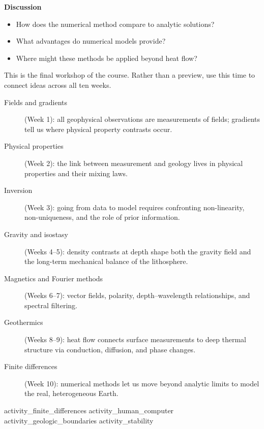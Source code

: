 \textbf{Discussion}
\begin{itemize}
    \item How does the numerical method compare to analytic solutions?
    \item What advantages do numerical models provide?
    \item Where might these methods be applied beyond heat flow?
\end{itemize}


This is the final workshop of the course. Rather than a preview, use this time to connect ideas across all ten weeks.

\begin{description}
    \item [Fields and gradients] (Week 1): all geophysical observations are measurements of fields; gradients tell us where physical property contrasts occur.
    \item [Physical properties] (Week 2): the link between measurement and geology lives in physical properties and their mixing laws.
    \item [Inversion] (Week 3): going from data to model requires confronting non-linearity, non-uniqueness, and the role of prior information.
    \item [Gravity and isostasy] (Weeks 4--5): density contrasts at depth shape both the gravity field and the long-term mechanical balance of the lithosphere.
    \item [Magnetics and Fourier methods] (Weeks 6--7): vector fields, polarity, depth--wavelength relationships, and spectral filtering.
    \item [Geothermics] (Weeks 8--9): heat flow connects surface measurements to deep thermal structure via conduction, diffusion, and phase changes.
    \item [Finite differences] (Week 10): numerical methods let us move beyond analytic limits to model the real, heterogeneous Earth.
\end{description}

\workshopend
\notepage
\notepage

{activity_finite_differences}
{activity_human_computer}
{activity_geologic_boundaries}
{activity_stability}